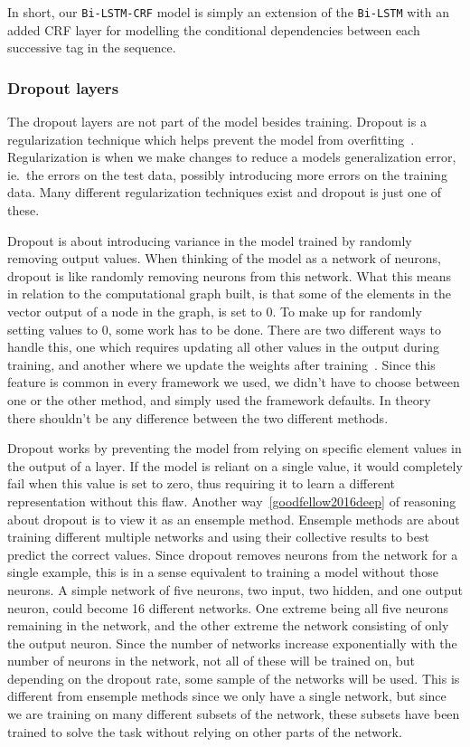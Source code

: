 In short, our \texttt{Bi-LSTM-CRF} model is simply an extension of the
\texttt{Bi-LSTM} with an added CRF layer for modelling the conditional
dependencies between each successive tag in the sequence.

\subsubsection{Dropout layers}

The dropout layers are not part of the model besides training. Dropout is a
regularization technique which helps prevent the model from
overfitting~\cite{goodfellow2016deep}. Regularization is when we make changes to
reduce a models generalization error, ie.\ the errors on the test data, possibly
introducing more errors on the training data. Many different regularization
techniques exist and dropout is just one of these.

Dropout is about introducing variance in the model trained by randomly removing
output values. When thinking of the model as a network of neurons, dropout is
like randomly removing neurons from this network. What this means in relation to
the computational graph built, is that some of the elements in the vector output
of a node in the graph, is set to 0. To make up for randomly setting values to
0, some work has to be done. There are two different ways to handle this, one
which requires updating all other values in the output during training, and
another where we update the weights after training~\cite{goodfellow2016deep}.
Since this feature is common in every framework we used, we didn't have to
choose between one or the other method, and simply used the framework defaults.
In theory there shouldn't be any difference between the two different methods.

Dropout works by preventing the model from relying on specific element values in
the output of a layer. If the model is reliant on a single value, it would
completely fail when this value is set to zero, thus requiring it to learn a
different representation without this flaw. Another way~\ref{goodfellow2016deep}
of reasoning about dropout is to view it as an ensemple method. Ensemple methods
are about training different multiple networks and using their collective
results to best predict the correct values. Since dropout removes neurons from
the network for a single example, this is in a sense equivalent to training a
model without those neurons. A simple network of five neurons, two input, two
hidden, and one output neuron, could become 16 different networks. One extreme
being all five neurons remaining in the network, and the other extreme the
network consisting of only the output neuron. Since the number of networks
increase exponentially with the number of neurons in the network, not all of
these will be trained on, but depending on the dropout rate, some sample of the
networks will be used. This is different from ensemple methods since we only
have a single network, but since we are training on many different subsets of
the network, these subsets have been trained to solve the task without relying
on other parts of the network. 

